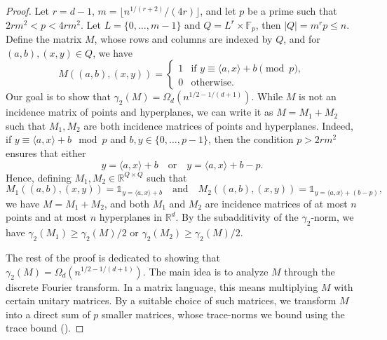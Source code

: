 \documentclass[11pt]{article}
\theoremstyle{plain}
\theoremstyle{definition}
\begin{document}
	\begin{proof}
		Let $r=d-1$, $m=\lfloor n^{1/(r+2)}/(4r)\rfloor$, and let $p$ be a prime such that $2rm^2<p<4rm^2$. Let $L=\{0,\dots,m-1\}$ and $Q=L^r\times \mathbb{F}_p$, then $|Q|=m^rp\leq n$. Define the matrix $M$, whose rows and columns are indexed by $Q$, and for $(a,b),(x,y)\in Q$, we have
		$$M((a,b),(x,y))=\begin{cases}1 &\text{if } y\equiv \langle a,x\rangle+b \pmod{p},\\
			0 &\text{otherwise.}\end{cases}$$
		Our goal is to show that $\gamma_2(M)=\Omega_d(n^{1/2-1/(d+1)})$. While $M$ is not an incidence matrix of points and hyperplanes, we can write it as $M=M_1+M_2$ such that $M_1,M_2$ are both incidence matrices of points and hyperplanes. Indeed, if $y\equiv \langle a,x\rangle+b\mod{p}$ and $b,y\in \{0,\dots,p-1\}$, then the condition $p>2rm^2$ ensures that either
		$$y=\langle a,x\rangle+b\quad\text{or}\quad y=\langle a,x\rangle+b-p.$$
		Hence, defining $M_1,M_2\in \mathbb{R}^{Q\times Q}$ such that 
		$$M_1((a,b),(x,y))=\mathds{1}_{y=\langle a,x\rangle+b}\quad\text{and}\quad M_2((a,b),(x,y))=\mathds{1}_{y=\langle a,x\rangle+ (b-p)},$$
		we have $M=M_1+M_2$, and both $M_1$ and $M_2$ are incidence matrices of at most $n$ points and at most $n$ hyperplanes in $\mathbb{R}^d$. By the subadditivity of the $\gamma_2$-norm, we have $\gamma_2(M_1)\geq \gamma_2(M)/2$ or $\gamma_2(M_2)\geq \gamma_2(M)/2$.
		
		\medskip
		
		The rest of the proof is dedicated to showing that $\gamma_2(M)=\Omega_d(n^{1/2-1/(d+1)})$. The main idea is to analyze $M$ through the discrete Fourier transform. In a matrix language, this means multiplying $M$ with certain unitary matrices. By a suitable choice of such matrices, we transform $M$ into a direct sum of $p$ smaller matrices, whose trace-norms we bound using the trace bound ().
        

\end{proof}
\end{document}
